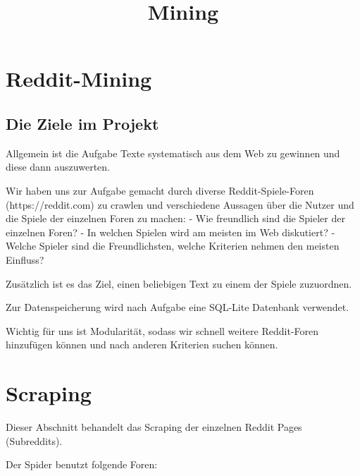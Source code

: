 \documentclass[11pt]{article}
\title{Mining}
\begin{document}
    
    
    \maketitle
    
    

    
    \section{Reddit-Mining}\label{reddit-mining}

\subsection{Die Ziele im Projekt}\label{die-ziele-im-projekt}

Allgemein ist die Aufgabe Texte systematisch aus dem Web zu gewinnen und
diese dann auszuwerten.

Wir haben uns zur Aufgabe gemacht durch diverse Reddit-Spiele-Foren
(https://reddit.com) zu crawlen und verschiedene Aussagen über die
Nutzer und die Spiele der einzelnen Foren zu machen: - Wie freundlich
sind die Spieler der einzelnen Foren? - In welchen Spielen wird am
meisten im Web diskutiert? - Welche Spieler sind die Freundlichsten,
welche Kriterien nehmen den meisten Einfluss?

Zusätzlich ist es das Ziel, einen beliebigen Text zu einem der Spiele
zuzuordnen.

Zur Datenspeicherung wird nach Aufgabe eine SQL-Lite Datenbank
verwendet.

Wichtig für uns ist Modularität, sodass wir schnell weitere Reddit-Foren
hinzufügen können und nach anderen Kriterien suchen können.

    \section{Scraping}\label{scraping}

Dieser Abschnitt behandelt das Scraping der einzelnen Reddit Pages
(Subreddits).

Der Spider benutzt folgende Foren:
\end{document}
